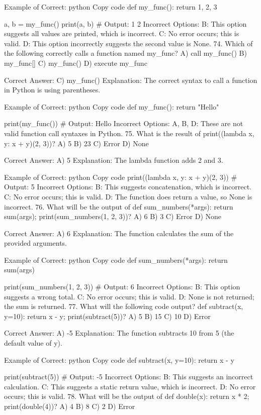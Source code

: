 Example of Correct:
python
Copy code
def my_func():
    return 1, 2, 3

a, b = my_func()
print(a, b)  # Output: 1 2
Incorrect Options:
B: This option suggests all values are printed, which is incorrect.
C: No error occurs; this is valid.
D: This option incorrectly suggests the second value is None.
74. Which of the following correctly calls a function named my_func?
A) call my_func()
B) my_func[]
C) my_func()
D) execute my_func

Correct Answer: C) my_func()
Explanation: The correct syntax to call a function in Python is using parentheses.

Example of Correct:
python
Copy code
def my_func():
    return "Hello"

print(my_func())  # Output: Hello
Incorrect Options:
A, B, D: These are not valid function call syntaxes in Python.
75. What is the result of print((lambda x, y: x + y)(2, 3))?
A) 5
B) 23
C) Error
D) None

Correct Answer: A) 5
Explanation: The lambda function adds 2 and 3.

Example of Correct:
python
Copy code
print((lambda x, y: x + y)(2, 3))  # Output: 5
Incorrect Options:
B: This suggests concatenation, which is incorrect.
C: No error occurs; this is valid.
D: The function does return a value, so None is incorrect.
76. What will be the output of def sum_numbers(*args): return sum(args); print(sum_numbers(1, 2, 3))?
A) 6
B) 3
C) Error
D) None

Correct Answer: A) 6
Explanation: The function calculates the sum of the provided arguments.

Example of Correct:
python
Copy code
def sum_numbers(*args):
    return sum(args)

print(sum_numbers(1, 2, 3))  # Output: 6
Incorrect Options:
B: This option suggests a wrong total.
C: No error occurs; this is valid.
D: None is not returned; the sum is returned.
77. What will the following code output? def subtract(x, y=10): return x - y; print(subtract(5))?
A) 5
B) 15
C) 10
D) Error

Correct Answer: A) -5
Explanation: The function subtracts 10 from 5 (the default value of y).

Example of Correct:
python
Copy code
def subtract(x, y=10):
    return x - y

print(subtract(5))  # Output: -5
Incorrect Options:
B: This suggests an incorrect calculation.
C: This suggests a static return value, which is incorrect.
D: No error occurs; this is valid.
78. What will be the output of def double(x): return x * 2; print(double(4))?
A) 4
B) 8
C) 2
D) Error

